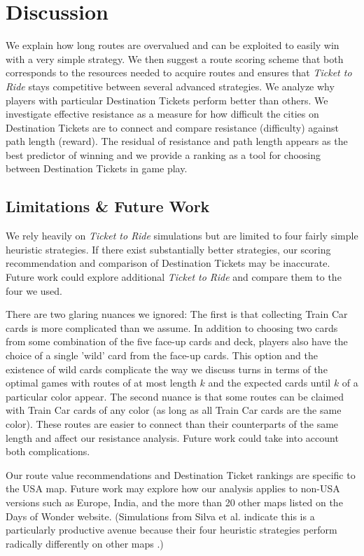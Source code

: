 \section{Discussion}
We explain how long routes
are overvalued and can be exploited to easily
win with a very simple strategy.
We then suggest a route scoring scheme that both corresponds
to the resources needed to acquire routes and ensures
that \textit{Ticket to Ride} stays competitive
between several advanced strategies.
We analyze why players
with particular Destination Tickets perform better
than others.
We investigate effective resistance as a measure
for how difficult the cities on Destination Tickets
are to connect and compare resistance (difficulty)
against path length (reward).
The residual of resistance and path length
appears as the best predictor of winning and we provide
a ranking as a tool for choosing
between Destination Tickets in game play.

\subsection{Limitations \& Future Work}
We rely heavily on \textit{Ticket to Ride}
simulations but are limited to four fairly simple
heuristic strategies.
If there exist substantially better strategies,
our scoring recommendation and comparison
of Destination Tickets may be inaccurate.
Future work could explore additional \textit{Ticket to Ride}
and compare them to the four we used.

There are two glaring nuances we ignored:
The first is that collecting Train Car cards
is more complicated than we assume.
In addition to choosing two cards from
some combination of the five face-up cards and deck,
players also have the choice of a single 'wild' card
from the face-up cards. 
This option and the existence of wild
cards complicate the way we discuss turns in terms
of the optimal games with routes of at most length $k$
and the expected cards until $k$ of a particular color
appear.
The second nuance is that some routes can be claimed
with Train Car cards of any color (as long as all Train
Car cards are the same color).
These routes are easier to connect than their counterparts
of the same length and affect our resistance analysis.
Future work could take into account both complications.

Our route value recommendations and
Destination Ticket rankings are specific to the USA map.
Future work may explore how our analysis
applies to non-USA versions such as Europe,
India, and the more than 20 other maps listed on the
Days of Wonder website.
(Simulations from Silva et al. indicate this
is a particularly productive avenue because 
their four heuristic strategies perform radically differently
on other maps \cite{de2017playtesting}.)

